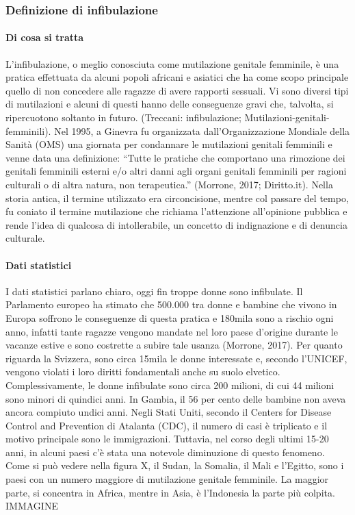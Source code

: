 \subsubsection{Definizione di infibulazione}
\paragraph{Di cosa si tratta}


L’infibulazione, o meglio conosciuta come mutilazione genitale femminile, è una pratica effettuata da alcuni popoli africani e asiatici che ha come scopo principale quello di non concedere alle ragazze di avere rapporti sessuali. Vi sono diversi tipi di mutilazioni e alcuni di questi hanno delle conseguenze gravi che, talvolta, si ripercuotono soltanto in futuro. (Treccani: infibulazione; Mutilazioni-genitali-femminili). Nel 1995, a Ginevra fu organizzata dall’Organizzazione Mondiale della Sanità (OMS) una giornata per condannare le mutilazioni genitali femminili e venne data una definizione: “Tutte le pratiche che comportano una rimozione dei genitali femminili esterni e/o altri danni agli organi genitali femminili per ragioni culturali o di altra natura, non terapeutica.” (Morrone, 2017; Diritto.it). Nella storia antica, il termine utilizzato era circoncisione, mentre col passare del tempo, fu coniato il termine mutilazione che richiama l’attenzione all’opinione pubblica e rende l’idea di qualcosa di intollerabile, un concetto di indignazione e di denuncia culturale.


\paragraph{Dati statistici}
I dati statistici parlano chiaro, oggi fin troppe donne sono infibulate. Il Parlamento europeo ha stimato che 500.000 tra donne e bambine che vivono in Europa soffrono le conseguenze di questa pratica e 180mila sono a rischio ogni anno, infatti tante ragazze vengono mandate nel loro paese d’origine durante le vacanze estive e sono costrette a subire tale usanza (Morrone, 2017). Per quanto riguarda la Svizzera, sono circa 15mila le donne interessate e, secondo l’UNICEF, vengono violati i loro diritti fondamentali anche su suolo elvetico. Complessivamente, le donne infibulate sono circa 200 milioni, di cui 44 milioni sono minori di quindici anni. In Gambia, il 56 per cento delle bambine non aveva ancora compiuto undici anni. Negli Stati Uniti, secondo il Centers for Disease Control and Prevention di Atalanta (CDC), il numero di casi è triplicato e il motivo principale sono le immigrazioni. Tuttavia, nel corso degli ultimi 15-20 anni, in alcuni paesi c’è stata una notevole diminuzione di questo fenomeno. Come si può vedere nella figura X, il Sudan, la Somalia, il Mali e l’Egitto, sono i paesi con un numero maggiore di mutilazione genitale femminile. La maggior parte, si concentra in Africa, mentre in Asia, è l’Indonesia la parte più colpita. 
IMMAGINE

